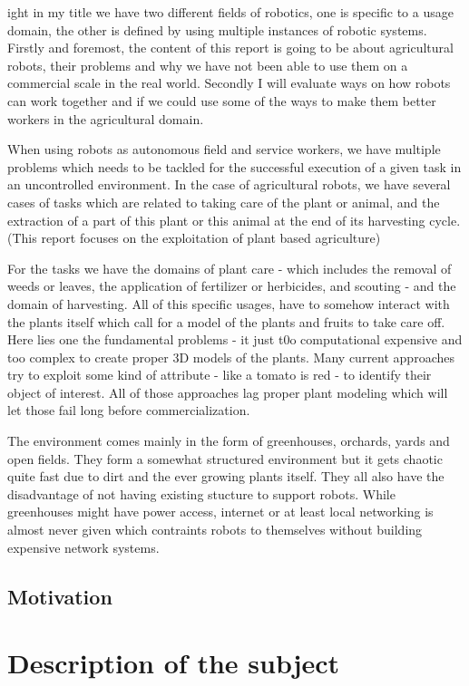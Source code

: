     
    ight in my title we have two different fields of robotics, one is specific to a usage domain, the other is defined by using multiple instances of robotic systems. Firstly and foremost, the content of this report is going to be about agricultural robots, their problems and why we have not been able to use them on a commercial scale in the real world.
    Secondly I will evaluate ways on how robots can work together and if we could use some of the ways to make them better workers in the agricultural domain.

    When using robots as autonomous field and service workers, we have multiple problems which needs to be tackled for the successful execution of a given task in an uncontrolled environment. In the case of agricultural robots, we have several cases of tasks which are related to taking care of the plant or animal, and the extraction of a part of this plant or this animal at the end of its harvesting cycle. (This report focuses on the exploitation of plant based agriculture)

    For the tasks we have the domains of plant care - which includes the removal of weeds or leaves, the application of fertilizer or herbicides, and scouting - and the domain of harvesting.
    All of this specific usages, have to somehow interact with the plants itself which call for a model of the plants and fruits to take care off. Here lies one the fundamental problems - it just t0o computational expensive and too complex  to create proper 3D models of the plants.  Many current approaches try to exploit some kind of attribute - like a tomato is red - to identify their object of interest. All of those approaches lag proper plant modeling which will let those fail long before commercialization.

    The environment comes mainly in the form of greenhouses, orchards, yards and open fields. They form a somewhat structured environment but it gets chaotic quite fast due to dirt and the ever growing plants itself. They all also have the disadvantage of not having existing stucture to support robots. While greenhouses might have power access, internet or at least local networking is almost never given which contraints robots to themselves without building expensive network systems.

    \section{Motivation}
    

    \chapter{Description of the subject}
